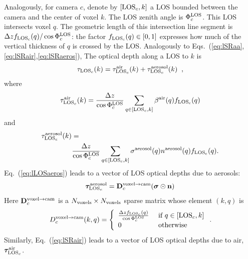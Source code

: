 \documentclass[10pt,letterpaper]{article}
\newcommand{\vect}[1]{\bm{#1}}
\begin{document}
Analogously, for camera $c$, denote by $[{\rm LOS}_c,k]$ a LOS bounded
between the camera and the center of voxel $k$. The LOS zenith angle
is $\Phi^{\rm LOS}_c$.  This LOS intersects voxel $q$. The geometric
length of this intersection line segment is $\Delta z f_{\rm
  LOS_c}(q)/\cos\Phi^{\rm LOS}_c$: the factor $f_{\rm LOS_c}(q)\in
[0,1]$ expresses how much of the vertical thickness of $q$ is crossed
by the LOS.  Analogously to
Eqs.~(\ref{eq:lSRaa},\ref{eq:lSRair},\ref{eq:lSRaeros}), The optical
depth %
along a LOS to $k$ is
\begin{equation}
  \tau_{{\rm LOS}_c}(k)=
  \tau_{{\rm LOS}_c}^{\rm air}(k) +  \tau_{{\rm LOS}_c}^{\rm aerosol}(k)
  \;\;,
  \label{eq:lLOSaerot}
\end{equation}
where
\begin{equation}
  \tau_{{\rm LOS}_c}^{\rm air}(k)=\frac{\Delta z}{\cos\Phi^{\rm LOS}_c}
  \sum_{q \in[{\rm LOS}_c,k]}
  \beta^{\rm air}(q)  f_{\rm LOS_c}(q)
  \label{eq:lLOSair}
\end{equation}
and
\begin{align}
  \label{eq:lLOSaeros}
  \tau_{{\rm LOS}_c}^{\rm aerosol}(k)=
  ~~~~~~~~~~~~~~~~~~~~~~~~~~~~~~~~~~~~~ ~~~~~~~~~~~~~~~~~~%
  ~~~~~
  \\
  \frac{\Delta z}{\cos\Phi^{\rm LOS}_c} \sum_{q \in[{\rm LOS}_c,k]}
  \sigma^{\rm aerosol}(q) n^{\rm aerosol}(q) f_{\rm LOS_c}(q).
  \nonumber
\end{align}
Eq.~(\ref{eq:lLOSaeros}) leads to a vector of LOS optical depths due
to aerosols:
\begin{equation}
  \vect{\tau}_{{\rm LOS}_c}^{\rm aerosol}=
  {\bf D}^{\mathrm{voxel \rightarrow cam}}_c
  (\vect{\sigma} \odot {\bf n})
  \label{eq:tauLOSvec1}
\end{equation}
Here ${\bf D}^{\mathrm{voxel \rightarrow cam}}_c$ is a $N_{\rm
  voxels}\times N_{\rm voxels}$ sparse matrix whose element $(k,q)$ is
\begin{equation}
  D^{\mathrm{voxel \rightarrow cam}}_c(k,q) =
  \left\{
    \begin{array}{ll}
      \frac{\Delta z f_{\rm LOS_c}(q)}{\cos\Phi^{\rm LOS}_c}
      & \mbox{ if $q \in[{\rm LOS}_c,k]$} \\
      0  & \mbox{ otherwise}
      \label{eq:Dvc}
    \end{array}
  \right.
  .
  \hspace{-0.05cm}
\end{equation}
Similarly, Eq.~(\ref{eq:lSRair}) leads to a vector of LOS optical
depths due to air, $\vect{\tau}_{{\rm LOS}_c}^{\rm air}$.
\end{document}
